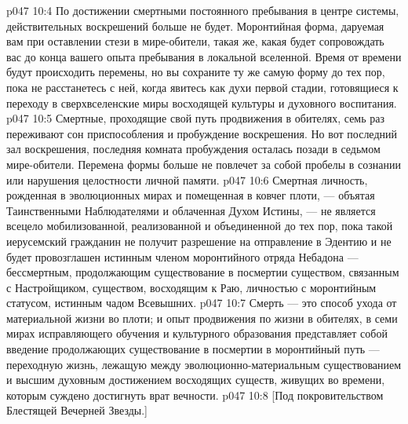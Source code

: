 \vs p047 10:4 \pc По достижении смертными постоянного пребывания в центре системы, действительных воскрешений больше не будет. Моронтийная форма, даруемая вам при оставлении стези в мире\hyp{}обители, такая же, какая будет сопровождать вас до конца вашего опыта пребывания в локальной вселенной. Время от времени будут происходить перемены, но вы сохраните ту же самую форму до тех пор, пока не расстанетесь с ней, когда явитесь как духи первой стадии, готовящиеся к переходу в сверхвселенские миры восходящей культуры и духовного воспитания.
\vs p047 10:5 Смертные, проходящие свой путь продвижения в обителях, семь раз переживают сон приспособления и пробуждение воскрешения. Но вот последний зал воскрешения, последняя комната пробуждения осталась позади в седьмом мире\hyp{}обители. Перемена формы больше не повлечет за собой пробелы в сознании или нарушения целостности личной памяти.
\vs p047 10:6 \pc Смертная личность, рожденная в эволюционных мирах и помещенная в ковчег плоти, --- объятая Таинственными Наблюдателями и облаченная Духом Истины, --- не является всецело мобилизованной, реализованной и объединенной до тех пор, пока такой иерусемский гражданин не получит разрешение на отправление в Эдентию и не будет провозглашен истинным членом моронтийного отряда Небадона --- бессмертным, продолжающим существование в посмертии существом, связанным с Настройщиком, существом, восходящим к Раю, личностью с моронтийным статусом, истинным чадом Всевышних.
\vs p047 10:7 \pc Смерть --- это способ ухода от материальной жизни во плоти; и опыт продвижения по жизни в обителях, в семи мирах исправляющего обучения и культурного образования представляет собой введение продолжающих существование в посмертии в моронтийный путь --- переходную жизнь, лежащую между эволюционно\hyp{}материальным существованием и высшим духовным достижением восходящих существ, живущих во времени, которым суждено достигнуть врат вечности.
\vsetoff
\vs p047 10:8 [Под покровительством Блестящей Вечерней Звезды.]
